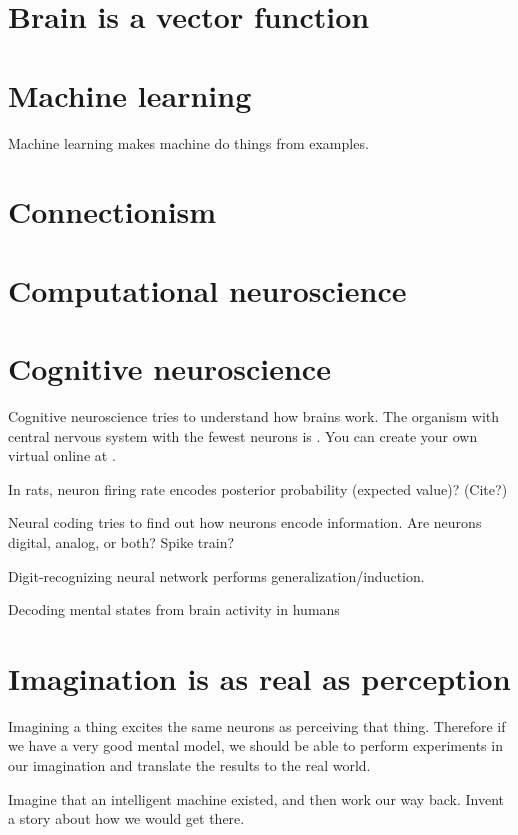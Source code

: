\section{Brain is a vector function}

\section{Machine learning}

Machine learning makes machine do things from examples.

\section{Connectionism}

\section{Computational neuroscience}

\section{Cognitive neuroscience}

Cognitive neuroscience tries to understand how brains work.
The organism with central nervous system with the fewest neurons is .
You can create your own virtual  online at \cite{openworm}.

In rats, neuron firing rate encodes posterior probability (expected value)?
(Cite?)

Neural coding tries to find out how neurons encode information.
Are neurons digital, analog, or both?
Spike train?

Digit-recognizing neural network performs generalization/induction.

Decoding mental states from brain activity in humans \cite{haynes2006decoding}

\section{Imagination is as real as perception}

Imagining a thing excites the same neurons as perceiving that thing.
Therefore if we have a very good mental model,
we should be able to perform experiments in our imagination
and translate the results to the real world.

Imagine that an intelligent machine existed,
and then work our way back.
Invent a story about how we would get there.

